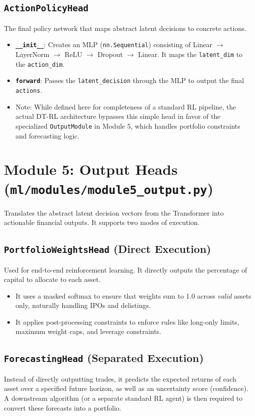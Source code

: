 \documentclass[12pt,a4paper]{report}
\begin{document}
\subsection{\texttt{ActionPolicyHead}}
The final policy network that maps abstract latent decisions to concrete actions.
\begin{itemize}
    \item \textbf{\texttt{\_\_init\_\_}}: Creates an MLP (\texttt{nn.Sequential}) consisting of Linear $\rightarrow$ LayerNorm $\rightarrow$ ReLU $\rightarrow$ Dropout $\rightarrow$ Linear. It maps the \texttt{latent\_dim} to the \texttt{action\_dim}.
    \item \textbf{\texttt{forward}}: Passes the \texttt{latent\_decision} through the MLP to output the final \texttt{actions}.
    \item Note: While defined here for completeness of a standard RL pipeline, the actual DT-RL architecture bypasses this simple head in favor of the specialized \texttt{OutputModule} in Module 5, which handles portfolio constraints and forecasting logic.
\end{itemize}

\section{Module 5: Output Heads (\texttt{ml/modules/module5\_output.py})}
Translates the abstract latent decision vectors from the Transformer into actionable financial outputs. It supports two modes of execution.

\subsection{\texttt{PortfolioWeightsHead} (Direct Execution)}
Used for end-to-end reinforcement learning. It directly outputs the percentage of capital to allocate to each asset.
\begin{itemize}
    \item It uses a masked softmax to ensure that weights sum to 1.0 across \textit{valid} assets only, naturally handling IPOs and delistings.
    \item It applies post-processing constraints to enforce rules like long-only limits, maximum weight caps, and leverage constraints.
\end{itemize}

\subsection{\texttt{ForecastingHead} (Separated Execution)}
Instead of directly outputting trades, it predicts the expected returns of each asset over a specified future horizon, as well as an uncertainty score (confidence). A downstream algorithm (or a separate standard RL agent) is then required to convert these forecasts into a portfolio.
\end{document}
